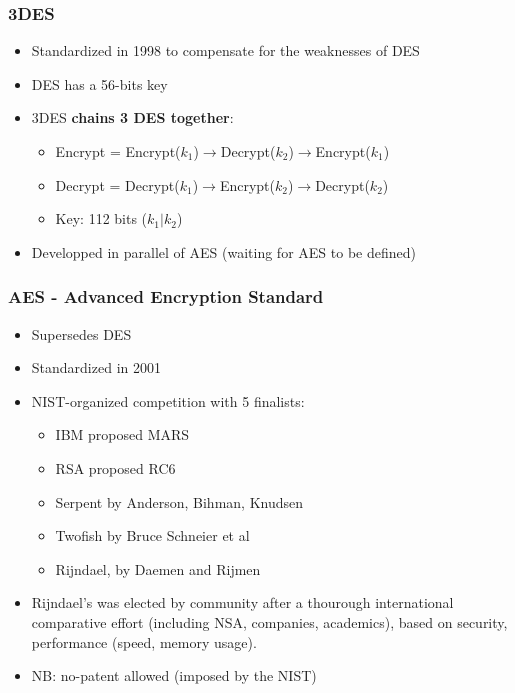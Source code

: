 \documentclass[
hyperref={pdfpagelabels=false}
,xcolor=table
]
{beamer}
\begin{document}



\begin{frame}
  \frametitle{3DES}

  \begin{itemize}
  \item Standardized in 1998 to compensate for the weaknesses of DES
  \item DES has a 56-bits key
  \item 3DES \textbf{chains 3 DES together}:
    \begin{itemize}
    \item Encrypt =  Encrypt($k_1$)$\rightarrow$Decrypt($k_2$)$\rightarrow$Encrypt($k_1$)
    \item Decrypt = Decrypt($k_1$)$\rightarrow$Encrypt($k_2$)$\rightarrow$Decrypt($k_2$)
    \item Key: 112 bits ($k_1|k_2$)
    \end{itemize}
  \item Developped in parallel of AES (waiting for AES to be defined)
  \end{itemize}
 
\end{frame}




\begin{frame}
  \frametitle{AES - Advanced Encryption Standard}
  \begin{itemize}
  \item Supersedes DES
  \item Standardized in 2001
  \item NIST-organized competition with 5 finalists:
    \begin{itemize}
    \item IBM proposed MARS
    \item RSA proposed RC6
    \item Serpent by Anderson, Bihman, Knudsen
    \item Twofish by Bruce Schneier et al
    \item Rijndael, by Daemen and Rijmen
    \end{itemize}
  \item Rijndael's was elected by community after a thourough international comparative effort (including NSA, companies, academics), based on security, performance (speed, memory usage).
  \item NB: no-patent allowed (imposed by the NIST)
  \end{itemize}
\end{frame}
\end{document}
